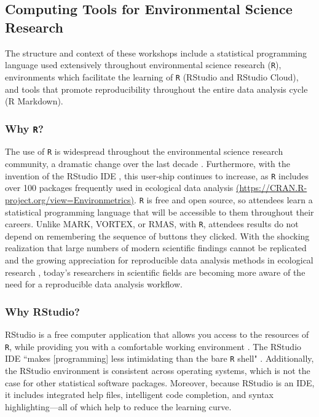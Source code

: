 \documentclass[12pt]{article}
\begin{document}
\subsection{Computing Tools for Environmental Science Research}  

\quad The structure and context of these workshops include a statistical
programming language used extensively throughout environmental science research
(\texttt{R}), environments which facilitate the learning of \texttt{R}
(RStudio and RStudio Cloud), and tools that promote reproducibility throughout
the entire data analysis cycle (R Markdown).

\subsubsection{Why \texttt{R}?} 

\quad The use of \texttt{R} is widespread throughout the environmental science
research community, a dramatic change over the last decade \citep{Rpopular}. 
Furthermore, with the invention of the RStudio IDE \citep{rstudio}, this
user-ship continues to increase, as \texttt{R} includes over 100 packages
frequently used in ecological data analysis \href{https://CRAN.R-project.org/view=Environmetrics}{(https://CRAN.R-project.org/view=Environmetrics)}. \texttt{R} is free and open source, so
attendees learn a statistical programming language that will be accessible to
them throughout their careers. Unlike MARK, VORTEX, or RMAS, with \texttt{R}, 
attendees results do not depend on remembering the sequence of buttons they
clicked. With the shocking realization that large numbers of modern scientific
findings cannot be replicated \citep{economist, johnson} and the growing
appreciation for reproducible data analysis methods in ecological research
\citep{reproducibilty-comment, repeatability, pva, reproducibility_ecology},
today's researchers in scientific fields are becoming more aware of the need for
a reproducible data analysis workflow. 

\subsubsection{Why RStudio?}

\quad RStudio is a free computer application that allows you access to the 
resources of \texttt{R}, while providing you with a comfortable working
environment \citep{rstudio}. The RStudio IDE ``makes [programming] less
intimidating than the bare \texttt{R} shell" \citep[p.\ 59]{mine}. Additionally,
the RStudio environment is consistent across operating systems, which is not the
case for other statistical software packages. Moreover, because RStudio is an
IDE, it includes integrated help files, intelligent code completion, and syntax 
highlighting---all of which help to reduce the learning curve. 
\end{document}
